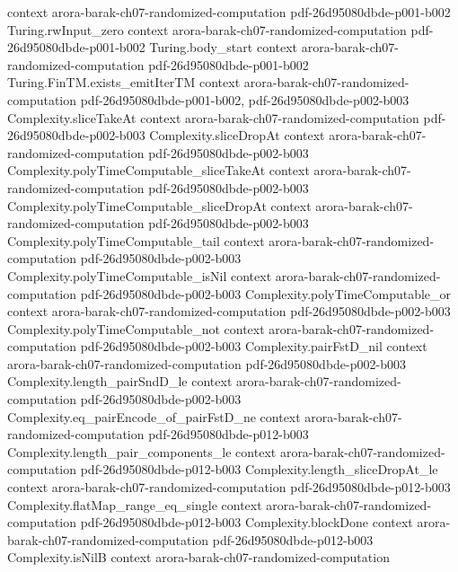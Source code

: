 \begin{theorem}
  {context}
  {arora-barak-ch07-randomized-computation}
  {pdf-26d95080dbde-p001-b002}
\proofstep
  {Turing.rwInput_zero}
  {context}
  {arora-barak-ch07-randomized-computation}
  {pdf-26d95080dbde-p001-b002}
\proofstep
  {Turing.body_start}
  {context}
  {arora-barak-ch07-randomized-computation}
  {pdf-26d95080dbde-p001-b002}
\proofstep
  {Turing.FinTM.exists_emitIterTM}
  {context}
  {arora-barak-ch07-randomized-computation}
  {pdf-26d95080dbde-p001-b002,
    pdf-26d95080dbde-p002-b003}
\proofstep
  {Complexity.sliceTakeAt}
  {context}
  {arora-barak-ch07-randomized-computation}
  {pdf-26d95080dbde-p002-b003}
\proofstep
  {Complexity.sliceDropAt}
  {context}
  {arora-barak-ch07-randomized-computation}
  {pdf-26d95080dbde-p002-b003}
\proofstep
  {Complexity.polyTimeComputable_sliceTakeAt}
  {context}
  {arora-barak-ch07-randomized-computation}
  {pdf-26d95080dbde-p002-b003}
\proofstep
  {Complexity.polyTimeComputable_sliceDropAt}
  {context}
  {arora-barak-ch07-randomized-computation}
  {pdf-26d95080dbde-p002-b003}
\proofstep
  {Complexity.polyTimeComputable_tail}
  {context}
  {arora-barak-ch07-randomized-computation}
  {pdf-26d95080dbde-p002-b003}
\proofstep
  {Complexity.polyTimeComputable_isNil}
  {context}
  {arora-barak-ch07-randomized-computation}
  {pdf-26d95080dbde-p002-b003}
\proofstep
  {Complexity.polyTimeComputable_or}
  {context}
  {arora-barak-ch07-randomized-computation}
  {pdf-26d95080dbde-p002-b003}
\proofstep
  {Complexity.polyTimeComputable_not}
  {context}
  {arora-barak-ch07-randomized-computation}
  {pdf-26d95080dbde-p002-b003}
\proofstep
  {Complexity.pairFstD_nil}
  {context}
  {arora-barak-ch07-randomized-computation}
  {pdf-26d95080dbde-p002-b003}
\proofstep
  {Complexity.length_pairSndD_le}
  {context}
  {arora-barak-ch07-randomized-computation}
  {pdf-26d95080dbde-p002-b003}
\proofstep
  {Complexity.eq_pairEncode_of_pairFstD_ne}
  {context}
  {arora-barak-ch07-randomized-computation}
  {pdf-26d95080dbde-p012-b003}
\proofstep
  {Complexity.length_pair_components_le}
  {context}
  {arora-barak-ch07-randomized-computation}
  {pdf-26d95080dbde-p012-b003}
\proofstep
  {Complexity.length_sliceDropAt_le}
  {context}
  {arora-barak-ch07-randomized-computation}
  {pdf-26d95080dbde-p012-b003}
\proofstep
  {Complexity.flatMap_range_eq_single}
  {context}
  {arora-barak-ch07-randomized-computation}
  {pdf-26d95080dbde-p012-b003}
\proofstep
  {Complexity.blockDone}
  {context}
  {arora-barak-ch07-randomized-computation}
  {pdf-26d95080dbde-p012-b003}
\proofstep
  {Complexity.isNilB}
  {context}
  {arora-barak-ch07-randomized-computation}

\end{theorem}
